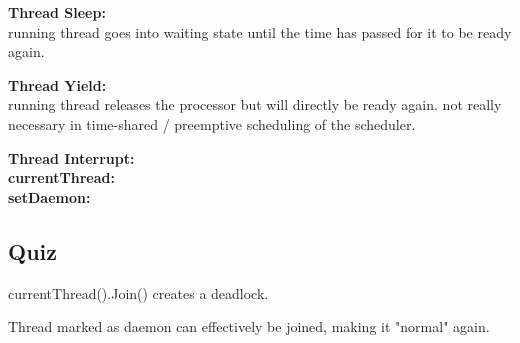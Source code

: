\textbf{Thread Sleep:} \\
running thread goes into waiting state until the time has passed for it to be ready again.

\textbf{Thread Yield:} \\
running thread releases the processor but will directly be ready again. not really necessary in time-shared / preemptive scheduling of the scheduler.

\textbf{Thread Interrupt:} \\

\textbf{currentThread:} \\

\textbf{setDaemon:} \\


\subsection*{Quiz}

currentThread().Join() creates a deadlock.

Thread marked as daemon can effectively be joined, making it "normal" again.
